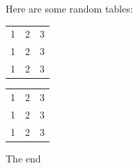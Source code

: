 \documentclass[12pt, letterpaper, twoside]{article}
\begin{document}
Here are some random tables:

\begin{center}
\begin{tabular}{ c c c }
1 & 2 & 3 \\ 
1 & 2 & 3 \\  
1 & 2 & 3    
\end{tabular}
\end{center}
 
\begin{center}
\begin{tabular}{ |c|c|c| } 
\hline
1 & 2 & 3 \\ 
1 & 2 & 3 \\  
1 & 2 & 3 \\  
 \hline
\end{tabular}
\end{center}

\begin{center}
    The end
\end{center} 
\end{document}
